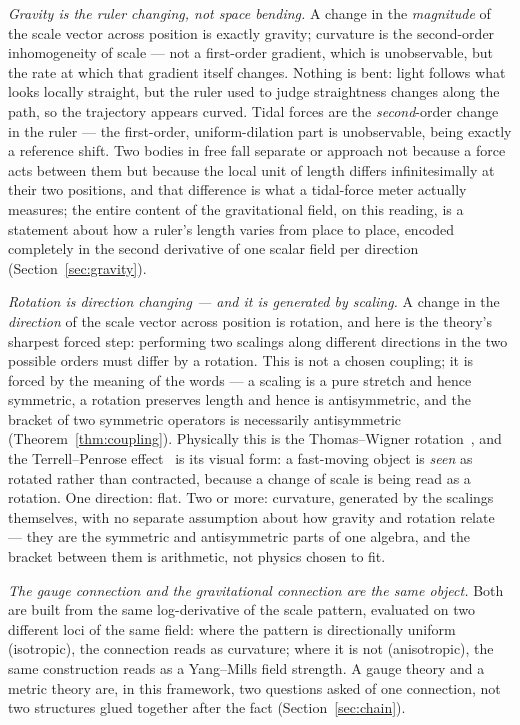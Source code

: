 \documentclass[aps,prd,twocolumn,superscriptaddress,nofootinbib]{revtex4-2}
\begin{document}
\emph{Gravity is the ruler changing, not space bending.} A change in the
\emph{magnitude} of the scale vector across position is exactly gravity;
curvature is the second-order inhomogeneity of scale — not a first-order
gradient, which is unobservable, but the rate at which that gradient
itself changes. Nothing is bent: light follows what looks locally
straight, but the ruler used to judge straightness changes along the
path, so the trajectory appears curved. Tidal forces are the
\emph{second}-order change in the ruler — the first-order, uniform-dilation
part is unobservable, being exactly a reference shift. Two bodies in
free fall separate or approach not because a force acts between them but
because the local unit of length differs infinitesimally at their two
positions, and that difference is what a tidal-force meter actually
measures; the entire content of the gravitational field, on this
reading, is a statement about how a ruler's length varies from place to
place, encoded completely in the second derivative of one scalar field
per direction (Section~\ref{sec:gravity}).

\emph{Rotation is direction changing — and it is \emph{generated} by
scaling.} A change in the \emph{direction} of the scale vector across
position is rotation, and here is the theory's sharpest forced step:
performing two scalings along different directions in the two possible
orders must differ by a rotation. This is not a chosen coupling; it is
forced by the meaning of the words — a scaling is a pure stretch and
hence symmetric, a rotation preserves length and hence is antisymmetric,
and the bracket of two symmetric operators is necessarily antisymmetric
(Theorem~\ref{thm:coupling}). Physically this is the Thomas–Wigner
rotation~\cite{Thomas1926}, and the
Terrell–Penrose effect~\cite{Terrell1959,Penrose1959} is its visual form: a
fast-moving object is \emph{seen} as rotated rather than contracted,
because a change of scale is being read as a rotation. One direction:
flat. Two or more: curvature, generated by the scalings themselves, with
no separate assumption about how gravity and rotation relate — they are
the symmetric and antisymmetric parts of one algebra, and the bracket
between them is arithmetic, not physics chosen to fit.

\emph{The gauge connection and the gravitational connection are the same
object.} Both are built from the same log-derivative of the scale
pattern, evaluated on two different loci of the same field: where the
pattern is directionally uniform (isotropic), the connection reads as
curvature; where it is not (anisotropic), the same construction reads as
a Yang–Mills field strength. A gauge theory and a metric theory are, in
this framework, two questions asked of one connection, not two
structures glued together after the fact (Section~\ref{sec:chain}).
\end{document}
